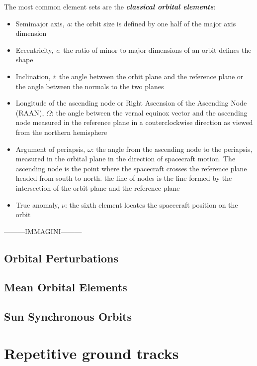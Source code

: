 The most common element sets are the \textit{\textbf{classical orbital elements}}:
\begin{itemize}
    \item Semimajor axis, \textit{a}: the orbit size is defined by one half of the major axis dimension
    \item Eccentricity, \textit{e}: the ratio of minor to major dimensions of an orbit defines the shape
    \item Inclination, \textit{i}: the angle between the orbit plane and the reference plane or the angle between the normals to the two planes
    \item Longitude of the ascending node or Right Ascension of the Ascending Node (RAAN), $\Omega$: the angle between the vernal equinox vector and the ascending node measured in the reference plane in a couterclockwise direction as viewed from the northern hemisphere
    \item Argument of periapsis, $\omega$: the angle from the ascending node to the periapsis, measured in the orbital plane in the direction of spacecraft motion. The ascending node is the point where the spacecraft crosses the reference plane headed from south to north. the line of nodes is the line formed by the intersection of the orbit plane and the reference plane
    \item True anomaly, $\nu$: the sixth element locates the spacecraft position on the orbit

    \cite{brown1998spacecraft}
\end{itemize}

---------IMMAGINI---------

\subsection{Orbital Perturbations}
\subsection{Mean Orbital Elements}
\subsection{Sun Synchronous Orbits}



\section{Repetitive ground tracks}


